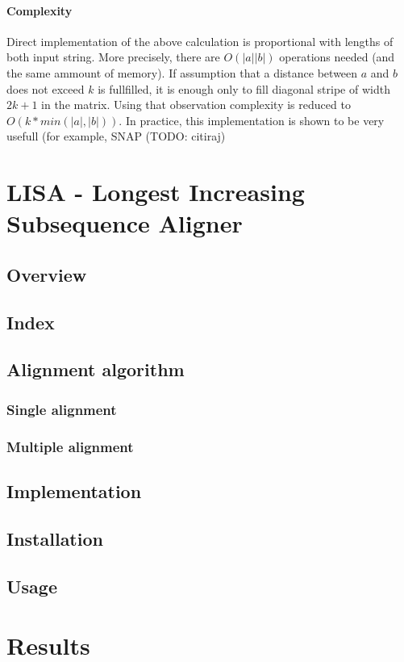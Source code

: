\documentclass[times, utf8, diplomski]{fer}
\begin{document}
\subsubsection{Complexity}
Direct implementation of the above calculation is proportional with lengths of both input string. More precisely, there are $O(|a||b|)$ operations needed (and the same ammount of memory). If assumption that a distance between $a$ and $b$ does not exceed $k$ is fullfilled, it is enough only to fill diagonal stripe of width $2k+1$ in the matrix. Using that observation complexity is reduced to $O(k*min(|a|,|b|))$. In practice, this implementation is shown to be very usefull (for example, SNAP (TODO: citiraj)


\chapter{LISA - Longest Increasing Subsequence Aligner}
\section{Overview}
\section{Index}
\section{Alignment algorithm}
\subsection{Single alignment}
\subsection{Multiple alignment}
\section{Implementation}
\section{Installation}
\section{Usage}

\chapter{Results}
\end{document}
